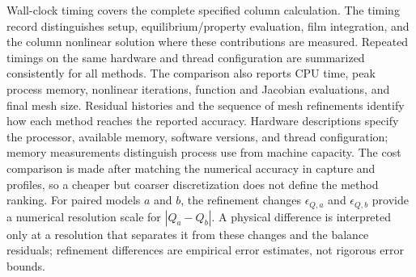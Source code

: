 Wall-clock timing covers the complete specified column calculation.
The timing record distinguishes setup, equilibrium/property evaluation, film integration, and the column nonlinear solution where these contributions are measured.
Repeated timings on the same hardware and thread configuration are summarized consistently for all methods.
The comparison also reports CPU time, peak process memory, nonlinear iterations, function and Jacobian evaluations, and final mesh size.
Residual histories and the sequence of mesh refinements identify how each method reaches the reported accuracy.
Hardware descriptions specify the processor, available memory, software versions, and thread configuration; memory measurements distinguish process use from machine capacity.
The cost comparison is made after matching the numerical accuracy in capture and profiles, so a cheaper but coarser discretization does not define the method ranking.
For paired models $a$ and $b$, the refinement changes $\epsilon_{Q,a}$ and $\epsilon_{Q,b}$ provide a numerical resolution scale for $|Q_a-Q_b|$.
A physical difference is interpreted only at a resolution that separates it from these changes and the balance residuals; refinement differences are empirical error estimates, not rigorous error bounds.
